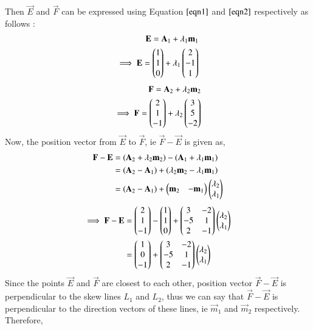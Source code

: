\documentclass[journal,12pt,twocolumn]{IEEEtran}
\begin{document}
Then $\vec{E}$ and $\vec{F}$ can be expressed using Equation $\ref{eqn1}$ and $\ref{eqn2}$ respectively as follows :
\begin{align}
    \mathbf{E} = \mathbf{A}_1+\lambda_1\mathbf{m}_1\\
    \implies\mathbf{E} = \begin{pmatrix}1 \\ 1 \\ 0\end{pmatrix} + \lambda_1\begin{pmatrix}2 \\ -1 \\ 1\end{pmatrix}
\end{align}
\begin{align}
    \mathbf{F} = \mathbf{A}_2 + \lambda_2\mathbf{m}_2\\
    \implies\mathbf{F} = \begin{pmatrix}2 \\ 1 \\ -1\end{pmatrix} + \lambda_2\begin{pmatrix}3 \\ 5 \\ -2\end{pmatrix}
\end{align}
Now, the position vector from $\vec{E}$ to $\vec{F}$, ie $\vec{F}-\vec{E}$ is given as,
\begin{align}
    \mathbf{F}-\mathbf{E} & = (\mathbf{A}_2 + \lambda_2\mathbf{m}_2) - (\mathbf{A}_1 + \lambda_1\mathbf{m}_1)\\& = (\mathbf{A}_2 - \mathbf{A}_1) + (\lambda_2\mathbf{m}_2 - \lambda_1\mathbf{m}_1)\\& = \label{e4} (\mathbf{A}_2 - \mathbf{A}_1) + \begin{pmatrix}\mathbf{m}_2 & -\mathbf{m}_1\end{pmatrix}\begin{pmatrix}\lambda_2 \\ \lambda_1\end{pmatrix}
\end{align}
\begin{align}
    \implies\mathbf{F}-\mathbf{E} & = \begin{pmatrix}2 \\ 1 \\ -1\end{pmatrix}-\begin{pmatrix}1 \\ 1 \\ 0\end{pmatrix} + \begin{pmatrix}3&-2\\-5&1\\2&-1\end{pmatrix}\begin{pmatrix}\lambda_2 \\ \lambda_1\end{pmatrix}\\&=\begin{pmatrix}1\\ 0 \\ -1\end{pmatrix}+ \begin{pmatrix}3&-2\\-5&1\\2&-1\end{pmatrix}\begin{pmatrix}\lambda_2 \\ \lambda_1\end{pmatrix} 
\end{align}
Since the points $\vec{E}$ and $\vec{F}$ are closest to each other, position vector $\vec{F}-\vec{E}$ is perpendicular to the skew lines $L_1$ and $L_2$, thus we can say that $\vec{F}-\vec{E}$ is perpendicular to the direction vectors of these lines, ie $\vec{m}_1$ and $\vec{m}_2$ respectively. Therefore,
\end{document}
